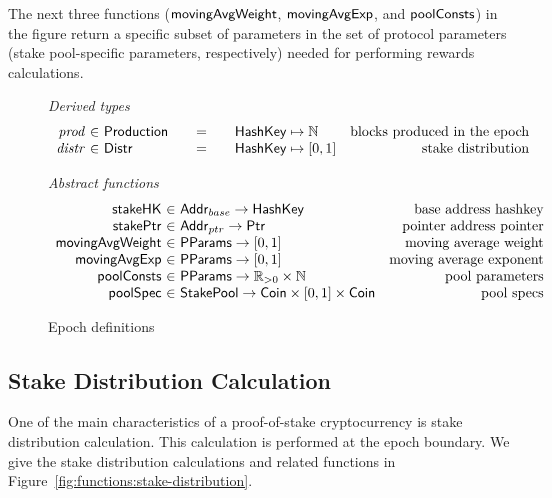 The next three functions ($\mathsf{movingAvgWeight}$, $\mathsf{movingAvgExp}$, and
$\mathsf{poolConsts}$) in the figure return a specific subset of parameters
in the set of protocol parameters (stake pool-specific parameters, respectively)
needed for performing rewards calculations.

\begin{figure}[htb]
  \emph{Derived types}
  \begin{equation*}
    \begin{array}{r@{~\in~}l@{\qquad=\qquad}lr}
      \var{prod}
      & \Production
      & \HashKey \mapsto \mathbb{N}
      & \text{blocks produced in the epoch} \\
      \var{distr}
      & \Distr
      & \HashKey \mapsto [0,1]
      & \text{stake distribution} \\
    \end{array}
  \end{equation*}


  \emph{Abstract functions}
  \begin{equation*}
    \begin{array}{r@{~\in~}lr}
      \fun{stakeHK} & \Addr_{base} \to \HashKey
      & \text{base address hashkey}\\
      \fun{stakePtr} & \Addr_{ptr} \to \Ptr
      & \text{pointer address pointer}\\
      \fun{movingAvgWeight} & \PParams \to [0, 1]
      & \text{moving average weight}\\
      \fun{movingAvgExp} & \PParams \to [0, 1]
      & \text{moving average exponent}\\
      \fun{poolConsts} & \PParams \to \mathbb{R}_{>0}\times\mathbb{N}
      & \text{pool parameters}\\
      \fun{poolSpec} & \StakePool \to \Coin\times [0,1] \times \Coin
      & \text{pool specs}\\
    \end{array}
  \end{equation*}
  \caption{Epoch definitions}
  \label{fig:epoch-defs}
\end{figure}

\subsection{Stake Distribution Calculation}
\label{sec:stake-dist}

One of the main characteristics of a proof-of-stake cryptocurrency is stake
distribution calculation. This calculation is performed at the epoch boundary.
We give the stake distribution calculations and related functions in
Figure~\ref{fig:functions:stake-distribution}.

